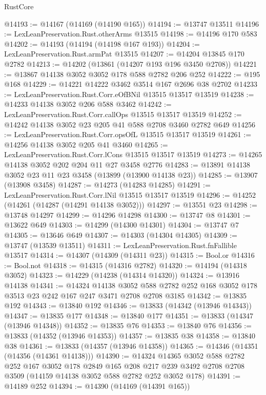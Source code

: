 \begin{lexlean}{RustCore}
\begin{coremodule}
@14193 := @14167 (@14169 (@14190 @165))
@14194 := @13747 @13511
@14196 := LexLeanPreservation.Rust.otherArms @13515
@14198 := @14196 @170 @583
@14202 := @14193 (@14194 (@14198 @167 @193))
@14204 := LexLeanPreservation.Rust.armPat @13515
@14207 := @14204 @13845 @170 @2782
@14213 := @14202 (@13861 (@14207 @193 @196 @3450 @2708))
@14221 := @13867 @14138 @3052 @3052 @178 @588 @2782 @206 @252
@14222 := @195 @168
@14229 := @14221 @14222 @3462 @3514 @167 @2696 @38 @2702
@14233 := LexLeanPreservation.Rust.Corr.eOfBNil @13515 @13517 @13519
@14238 := @14233 @14138 @3052 @206 @588 @3462
@14242 := LexLeanPreservation.Rust.Corr.callOps @13515 @13517 @13519
@14252 := @14242 @14138 @3052 @23 @205 @41 @588 @2708 @3460 @2782 @649
@14256 := LexLeanPreservation.Rust.Corr.opsOfL @13515 @13517 @13519
@14261 := @14256 @14138 @3052 @205 @41 @3460
@14265 := LexLeanPreservation.Rust.Corr.lCons @13515 @13517 @13519
@14273 := @14265 @14138 @3052 @202 @204 @11 @27 @3458 @2776
@14283 := @13891 @14138 @3052 @23 @11 @23 @3458 (@13899 (@13900 @14138 @23))
@14285 := @13907 (@13908 @3458)
@14287 := @14273 (@14283 @14285)
@14291 := LexLeanPreservation.Rust.Corr.lNil @13515 @13517 @13519
@14296 := @14252 (@14261 (@14287 (@14291 @14138 @3052)))
@14297 := @13551 @23
@14298 := @13748 @14297
@14299 := @14296 @14298
@14300 := @13747 @8
@14301 := @13622 @649
@14303 := @14299 (@14300 @14301)
@14304 := @13747 @7
@14305 := @13646 @649
@14307 := @14303 (@14304 @14305)
@14309 := @13747 (@13539 @13511)
@14311 := LexLeanPreservation.Rust.fnFallible @13517
@14314 := @14307 (@14309 (@14311 @23))
@14315 := Bool.or
@14316 := Bool.not
@14318 := @14315 (@14316 @2782)
@14320 := @14194 (@14318 @3052)
@14323 := @14229 (@14238 (@14314 @14320))
@14324 := @13916 @14138
@14341 := @14324
    @14138
    @3052
    @588
    @2782
    @252
    @168
    @3052
    @178
    @3513
    @23
    @242
    @167
    @247
    @3471
    @2708
    @2708
    @3185
@14342 := @13835 @192
@14343 := @13840 @192
@14346 := @13833 (@14342 (@13946 @14343))
@14347 := @13835 @177
@14348 := @13840 @177
@14351 := @13833 (@14347 (@13946 @14348))
@14352 := @13835 @76
@14353 := @13840 @76
@14356 := @13833 (@14352 (@13946 @14353))
@14357 := @13835 @38
@14358 := @13840 @38
@14361 := @13833 (@14357 (@13946 @14358))
@14365 := @14346 (@14351 (@14356 (@14361 @14138)))
@14390 := @14324
    @14365
    @3052
    @588
    @2782
    @252
    @167
    @3052
    @178
    @2849
    @165
    @208
    @217
    @239
    @3492
    @2708
    @2708
    @3509
    (@14159 @14138 @3052 @588 @2782 @252 @3052 @178)
@14391 := @14189 @252
@14394 := @14390 (@14169 (@14391 @165))

\end{coremodule}
\end{lexlean}
